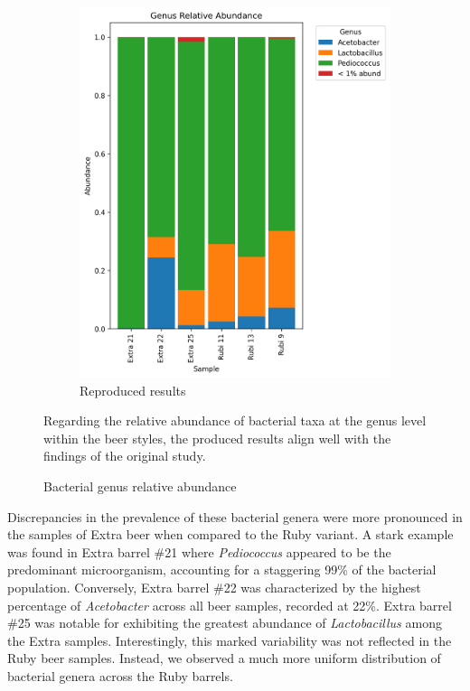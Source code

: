 \begin{figure}[H]
\begin{subfigure}[b]{0.45\textwidth}
         \includegraphics[width=\textwidth]{images/doppel_baceteria_genus_relative_abundance.png}
        \caption{Reproduced results}
     \end{subfigure}
    \caption{Bacterial genus relative abundance}
    \small Regarding the relative abundance of bacterial taxa at the genus level within the beer styles, the produced results align well with the findings of the original study.
    \label{fig:methods:doppelbock_relative_abundence_bacterial}
\end{figure}

Discrepancies in the prevalence of these bacterial genera were more pronounced in the samples of Extra beer when compared to the Ruby variant. A stark example was found in Extra barrel \#21 where \textit{Pediococcus} appeared to be the predominant microorganism, accounting for a staggering 99\% of the bacterial population. Conversely, Extra barrel \#22 was characterized by the highest percentage of \textit{Acetobacter} across all beer samples, recorded at 22\%. Extra barrel \#25 was notable for exhibiting the greatest abundance of \textit{Lactobacillus} among the Extra samples. Interestingly, this marked variability was not reflected in the Ruby beer samples. Instead, we observed a much more uniform distribution of bacterial genera across the Ruby barrels.


